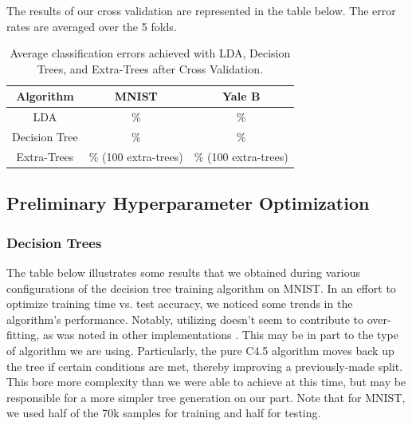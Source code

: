 The results of our cross validation are represented in the table below. The error rates are averaged over the 5 folds.
\begin{table}[H]
  \centering
  \begin{tabular}{||c | c | c||} 
    \hline
    Algorithm & MNIST & Yale B \\
    \hline\hline
    LDA & \%  & \% \\ 
    \hline
    Decision Tree & \% & \% \\ 
    \hline
    Extra-Trees & \% (100 extra-trees) & \% (100 extra-trees) \\
    \hline
  \end{tabular}
  \caption{Average classification errors achieved with LDA, Decision Trees, and Extra-Trees after Cross Validation.}
\end{table}




\iffalse
\subsection{Preliminary Hyperparameter Optimization}

\subsubsection{Decision Trees}

The table below illustrates some results that we obtained during various configurations of the decision tree training algorithm on MNIST. In an effort to optimize training time vs. test accuracy, we noticed some trends in the algorithm's performance. Notably, utilizing  doesn't seem to contribute to over-fitting, as was noted in other implementations \cite{matlab:fitctree}. This may be in part to the type of algorithm we are using. Particularly, the pure C4.5 algorithm moves back up the tree if certain conditions are met, thereby improving a previously-made split. This bore more complexity than we were able to achieve at this time, but may be responsible for a more simpler tree generation on our part. Note that for MNIST, we used half of the 70k samples for training and half for testing.

